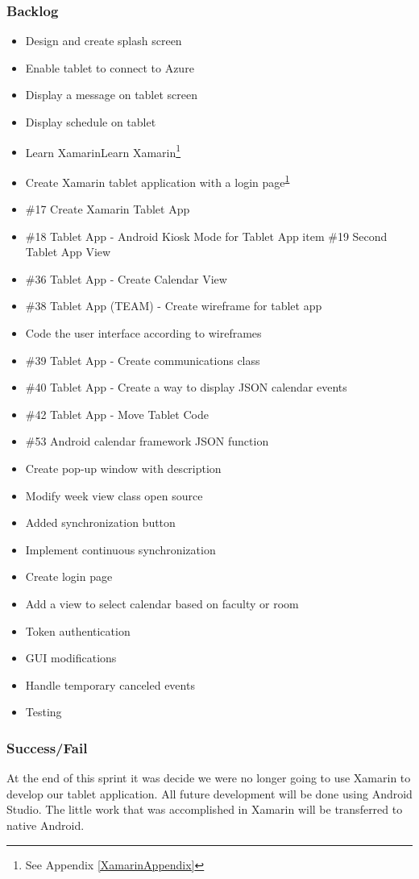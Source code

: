 \subsubsection{Backlog}
\begin{itemize}
\item Design and create splash screen
\item Enable tablet to connect to Azure
\item Display a message on tablet screen
\item Display schedule on tablet	
\item Learn XamarinLearn Xamarin\footnote{See Appendix \ref{XamarinAppendix}\label{note2}}
\item Create Xamarin tablet application with a login page\textsuperscript{\ref{note2}}
\item \#17 Create Xamarin Tablet App
\item \#18 Tablet App - Android Kiosk Mode for Tablet App
item \#19 Second Tablet App View
\item \#36 Tablet App - Create Calendar View
\item \#38 Tablet App (TEAM) - Create wireframe for tablet app
\item Code the user interface according to wireframes
\item \#39 Tablet App - Create communications class
\item \#40 Tablet App - Create a way to display JSON calendar events
\item \#42 Tablet App - Move Tablet Code
\item \#53 Android calendar framework JSON function
\item Create pop-up window with description
\item Modify week view class open source
\item Added synchronization button
\item Implement continuous synchronization
\item Create login page
\item Add a view to select calendar based on faculty or room
\item Token authentication
\item GUI modifications
\item Handle temporary canceled events
\item Testing
\end{itemize}

\subsubsection{Success/Fail}
At the end of this sprint it was decide we were no longer going to use Xamarin to develop our tablet application.  All future development will be done using Android Studio.  The little work that was accomplished in Xamarin will be transferred to native Android.

